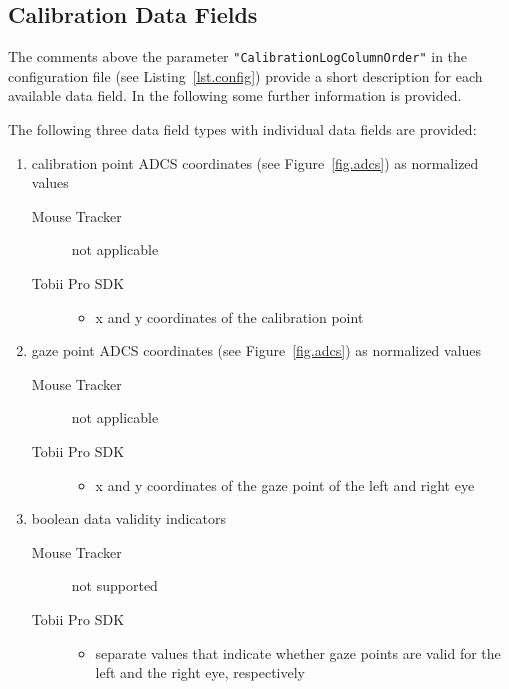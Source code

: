 \documentclass[a4paper,oneside]{book}
\begin{document}
\subsection{Calibration Data Fields}
The comments above the parameter \texttt{"CalibrationLogColumnOrder"} in the configuration file (see Listing~\ref{lst.config}) provide a short description for each available data field.
In the following some further information is provided.

The following three data field types with individual data fields are provided:
\begin{enumerate}
    \item calibration point ADCS coordinates (see Figure~\ref{fig.adcs}) as normalized values
        \begin{description}
            \item[Mouse Tracker] not applicable
            \item[Tobii Pro SDK] \hfill
                \begin{itemize}
                    \item x and y coordinates of the calibration point
                \end{itemize}
        \end{description}
    \item gaze point ADCS coordinates (see Figure~\ref{fig.adcs}) as normalized values
        \begin{description}
            \item[Mouse Tracker] not applicable
            \item[Tobii Pro SDK] \hfill
                \begin{itemize}
                    \item x and y coordinates of the gaze point of the left and right eye
                \end{itemize}
        \end{description}
    \item boolean data validity indicators
        \begin{description}
            \item[Mouse Tracker] not supported
            \item[Tobii Pro SDK] \hfill
                \begin{itemize}
                    \item separate values that indicate whether gaze points are valid for the left and the right eye, respectively
                \end{itemize}

\end{description}
\end{enumerate}
\end{document}
